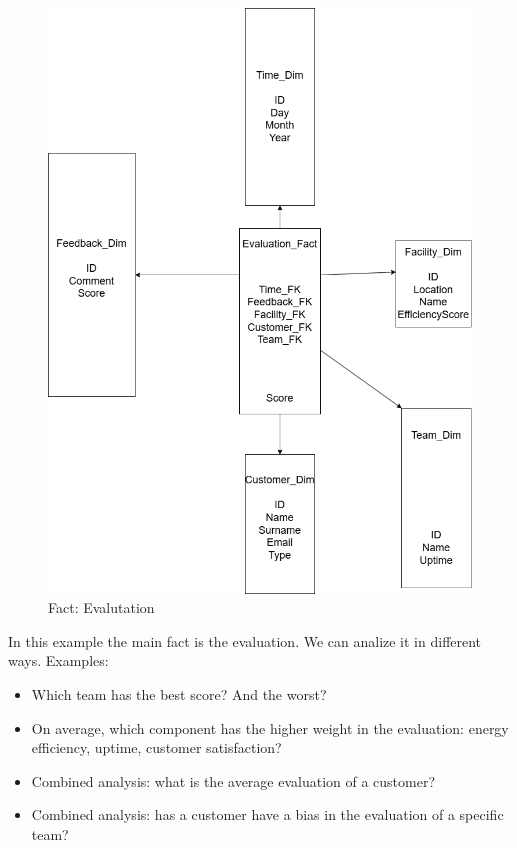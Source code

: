 \begin{figure}[H]
    \centering
    \includegraphics[width=\textwidth,height=0.7\textheight]{images/Fact2.png}
    \caption{Fact: Evalutation}
\end{figure}

\noindent In this example the main fact is the evaluation. We can analize it in different ways. Examples:
\begin{itemize}
    \item Which team has the best score? And the worst?
    \item On average, which component has the higher weight in the evaluation: energy efficiency, uptime, customer satisfaction?
    \item Combined analysis: what is the average evaluation of a customer?
    \item Combined analysis: has a customer have a bias in the evaluation of a specific team?
\end{itemize}
